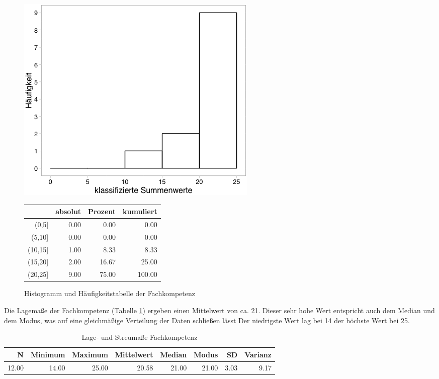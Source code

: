 \documentclass[12pt, bibliography=totoc]{scrartcl}
\begin{document}
\begin{figure}[H]

\begin{minipage}{.4\linewidth}
\includegraphics[width=0.8\linewidth]{Anhang/FKHistnn.png}

\end{minipage}
\begin{minipage}{.4\linewidth}
\centering
\raisebox{\depth}
{\begin{tabular}{rrrr}
  \hline
 & absolut & Prozent & kumuliert \\
  \hline
(0,5] & 0.00 & 0.00 & 0.00 \\
  (5,10] & 0.00 & 0.00 & 0.00 \\
  (10,15] & 1.00 & 8.33 & 8.33 \\
  (15,20] & 2.00 & 16.67 & 25.00 \\
  (20,25] & 9.00 & 75.00 & 100.00 \\
   \hline
\end{tabular}

}
\end{minipage}
\caption{Histogramm und Häufigkeitstabelle der Fachkompetenz}
\label{FK}
\end{figure}

Die Lagemaße der Fachkompetenz (Tabelle \ref{tab:lFK}) ergeben einen
Mittelwert von ca. 21. Dieser sehr hohe Wert entspricht auch dem Median
und dem Modus, was auf eine gleichmäßige Verteilung der Daten schließen
lässt Der niedrigste Wert lag bei 14 der höchste Wert bei 25.

\begin{table}[H]
\centering
\caption{Lage- und Streumaße Fachkompetenz}
\label{tab:lFK}
\begin{tabular}{rrrrrrrr}
  \hline
  N & Minimum & Maximum & Mittelwert & Median & Modus & SD & Varianz \\
  \hline
 12.00 & 14.00 & 25.00 & 20.58 & 21.00 & 21.00 & 3.03 & 9.17 \\
   \hline
\end{tabular}
\end{table}
\end{document}
